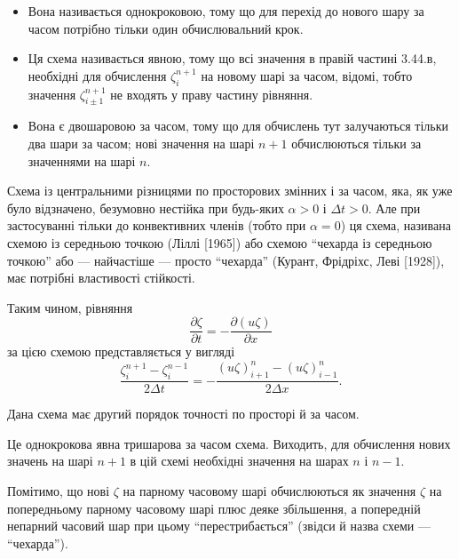 \begin{remark}
    \nothing
    \begin{itemize}
        \item Вона називається однокроковою, тому що для перехід до нового шару за часом потрібно тільки один обчислювальний крок. 
        \item Ця схема називається явною, тому що всі значення в правій частині 3.44.в, необхідні для обчислення $\zeta_i^{n + 1}$ на новому шарі за часом, відомі, тобто значення $\zeta_{i \pm 1}^{n + 1}$ не входять у праву частину рівняння.
        \item Вона є двошаровою за часом, тому що для обчислень тут залучаються тільки два шари за часом; нові значення на шарі $n + 1$ обчислюються тільки за значеннями на шарі $n$.
    \end{itemize}
\end{remark}

Схема із центральними різницями по просторових змінних і за часом, яка, як уже було відзначено, безумовно нестійка при будь-яких $\alpha > 0$ і $\Delta t > 0$. Але при застосуванні тільки до конвективних членів (тобто при $\alpha = 0$) ця схема, називана схемою із середньою точкою (Ліллі [1965]) або схемою ``чехарда із середньою точкою'' або --- найчастіше --- просто ``чехарда'' (Курант, Фрідріхс, Леві [1928]), має потрібні властивості стійкості. 

\begin{example}
    Таким чином, рівняння
    \begin{equation}
        \label{eq:3.144}
        \frac{\partial \zeta}{\partial t} = -\frac{\partial(u \zeta)}{\partial x}
    \end{equation}
    за цією схемою представляється у вигляді
    \begin{equation}
        \label{eq:3.145}
        \frac{\zeta_i^{n + 1} - \zeta_i^{n - 1}}{2 \Delta t} = -\frac{(u \zeta)_{i + 1}^n - (u \zeta)_{i - 1}^n}{2 \Delta x}.
    \end{equation}
\end{example}

\begin{proposition}
    Дана схема має другий порядок точності по просторі й за часом.
\end{proposition}

Це однокрокова явна тришарова за часом схема. Виходить, для обчислення нових значень на шарі $n + 1$ в цій схемі необхідні значення на шарах $n$ і $n - 1$. 

\begin{remark}
    Помітимо, що нові $\zeta$ на парному часовому шарі обчислюються як значення $\zeta$ на попередньому парному часовому шарі плюс деяке збільшення, а попередній непарний часовий шар при цьому ``перестрибається'' (звідси й назва схеми --- ``чехарда'').
\end{remark}

